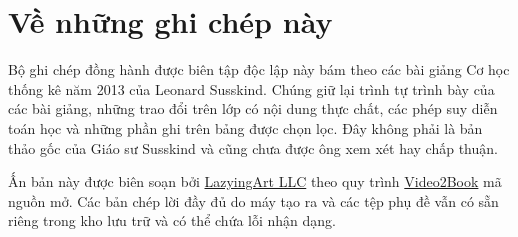 \documentclass[11pt,oneside]{book}
\begin{document}
\frontmatter
\hypersetup{pageanchor=false}

\hypersetup{pageanchor=true}

\chapter*{Về những ghi chép này}
Bộ ghi chép đồng hành được biên tập độc lập này bám theo các bài giảng Cơ học thống kê năm 2013 của Leonard Susskind. Chúng giữ lại trình tự trình bày của các bài giảng, những trao đổi trên lớp có nội dung thực chất, các phép suy diễn toán học và những phần ghi trên bảng được chọn lọc. Đây không phải là bản thảo gốc của Giáo sư Susskind và cũng chưa được ông xem xét hay chấp thuận.

Ấn bản này được biên soạn bởi \href{https://lazying.art}{LazyingArt LLC} theo quy trình \href{https://github.com/lachlanchen/Video2Book}{Video2Book} mã nguồn mở. Các bản chép lời đầy đủ do máy tạo ra và các tệp phụ đề vẫn có sẵn riêng trong kho lưu trữ và có thể chứa lỗi nhận dạng.
\clearpage
\tableofcontents
\mainmatter










\end{document}
